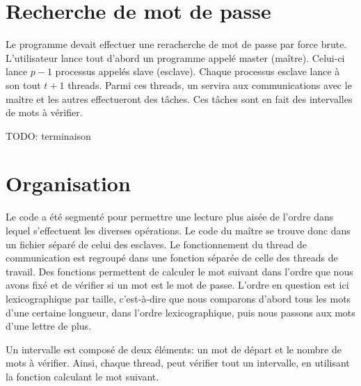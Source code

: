 \section{Recherche de mot de passe} %
\label{sec:recherche_de_mot_de_passe}

Le programme devait effectuer une reracherche de mot de passe par force brute. L'utilisateur lance tout d'abord un programme appelé master (maître). Celui-ci lance $p-1$ processus appelés slave (esclave). Chaque processus esclave lance à son tout $t+1$ threads. Parmi ces threads, un servira aux communications avec le maître et les autres effectueront des tâches. Ces tâches sont en fait des intervalles de mots à vérifier. 

TODO: terminaison

\section{Organisation} %
\label{sec:organisation}

Le code a été segmenté pour permettre une lecture plus aisée de l'ordre dans lequel s'effectuent les diverses opérations. Le code du maître se trouve donc dans un fichier séparé de celui des esclaves. Le fonctionnement du thread de communication est regroupé dans une fonction séparée de celle des threads de travail. Des fonctions permettent de calculer le mot suivant dans l'ordre que nous avons fixé et de vérifier si un mot est le mot de passe. L'ordre en question est ici lexicographique par taille, c'est-à-dire que nous comparons d'abord tous les mots d'une certaine longueur, dans l'ordre lexicographique, puis nous passons aux mots d'une lettre de plus.

Un intervalle est composé de deux éléments: un mot de départ et le nombre de mots à vérifier. Ainsi, chaque thread, peut vérifier tout un intervalle, en utilisant la fonction calculant le mot suivant.
